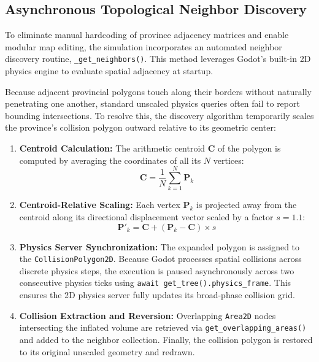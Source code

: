 \subsection{Asynchronous Topological Neighbor Discovery}
\label{subsec:neighbor_discovery}

To eliminate manual hardcoding of province adjacency matrices and enable modular map editing, the simulation incorporates an automated neighbor discovery routine, \texttt{\_get\_neighbors()}. This method leverages Godot's built-in 2D physics engine to evaluate spatial adjacency at startup.

Because adjacent provincial polygons touch along their borders without naturally penetrating one another, standard unscaled physics queries often fail to report bounding intersections. To resolve this, the discovery algorithm temporarily scales the province's collision polygon outward relative to its geometric center:

\begin{enumerate}
    \item \textbf{Centroid Calculation:} The arithmetic centroid $\mathbf{C}$ of the polygon is computed by averaging the coordinates of all its $N$ vertices:
    \begin{equation}
        \mathbf{C} = \frac{1}{N} \sum_{k=1}^{N} \mathbf{P}_k
    \end{equation}
    \item \textbf{Centroid-Relative Scaling:} Each vertex $\mathbf{P}_k$ is projected away from the centroid along its directional displacement vector scaled by a factor $s = 1.1$:
    \begin{equation}
        \mathbf{P}'_k = \mathbf{C} + (\mathbf{P}_k - \mathbf{C}) \times s
    \end{equation}
    \item \textbf{Physics Server Synchronization:} The expanded polygon is assigned to the \texttt{CollisionPolygon2D}. Because Godot processes spatial collisions across discrete physics steps, the execution is paused asynchronously across two consecutive physics ticks using \texttt{await get\_tree().physics\_frame}. This ensures the 2D physics server fully updates its broad-phase collision grid.
    \item \textbf{Collision Extraction and Reversion:} Overlapping \texttt{Area2D} nodes intersecting the inflated volume are retrieved via \texttt{get\_overlapping\_areas()} and added to the neighbor collection. Finally, the collision polygon is restored to its original unscaled geometry and redrawn.
\end{enumerate}


